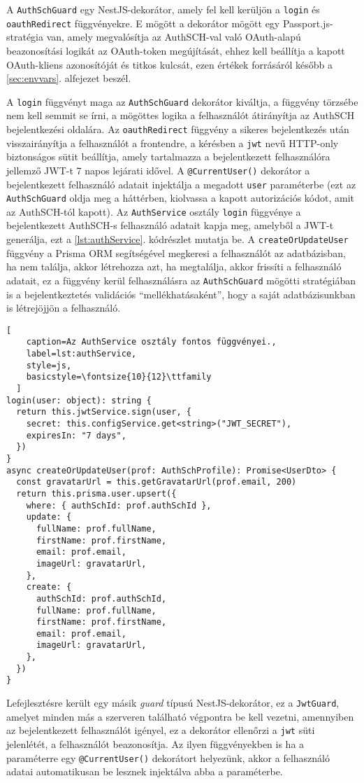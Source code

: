 A \verb|AuthSchGuard| egy NestJS-dekorátor, amely fel kell kerüljön a \verb|login| és \verb|oauthRedirect| függvényekre. E mögött a dekorátor mögött egy Passport.js-stratégia\cite{passport} van, amely megvalósítja az AuthSCH-val való OAuth-alapú beazonosítási logikát az OAuth-token megújítását, ehhez kell beállítja a kapott OAuth-kliens azonosítóját és titkos kulcsát, ezen értékek forrásáról később a \ref{sec:envvars}. alfejezet beszél.

A \verb|login| függvényt maga az \verb|AuthSchGuard| dekorátor kiváltja, a függvény törzsébe nem kell semmit se írni, a mögöttes logika a felhasználót átirányítja az AuthSCH bejelentkezési oldalára. Az \verb|oauthRedirect| függvény a sikeres bejelentkezés után visszairányítja a felhasználót a frontendre, a kérésben a \verb|jwt| nevű HTTP-only biztonságos sütit beállítja, amely tartalmazza a bejelentkezett felhasználóra jellemző JWT-t 7 napos lejárati idővel. A \verb|@CurrentUser()| dekorátor a bejelentkezett felhasználó adatait injektálja a megadott \verb|user| paraméterbe (ezt az \verb|AuthSchGuard| oldja meg a háttérben, kiolvassa a kapott autorizációs kódot, amit az AuthSCH-tól kapott). Az \verb|AuthService| osztály \verb|login| függvénye a bejelentkezett AuthSCH-s felhasználó adatait kapja meg, amelyből a JWT-t generálja, ezt a \ref{lst:authService}. kódrészlet mutatja be. A \verb|createOrUpdateUser| függvény a Prisma ORM segítségével megkeresi a felhasználót az adatbázisban, ha nem találja, akkor létrehozza azt, ha megtalálja, akkor frissíti a felhasználó adatait, ez a függvény kerül felhasználásra az \verb|AuthSchGuard| mögötti stratégiában is a bejelentkeztetés validációs ``mellékhatásaként'', hogy a saját adatbázisunkban is létrejöjjön a felhasználó.

\begin{minipage}{0.92\textwidth}
  \begin{lstlisting}[
    caption=Az AuthService osztály fontos függvényei.,
    label=lst:authService,
    style=js,
    basicstyle=\fontsize{10}{12}\ttfamily
  ]
login(user: object): string {
  return this.jwtService.sign(user, {
    secret: this.configService.get<string>("JWT_SECRET"),
    expiresIn: "7 days",
  })
}
async createOrUpdateUser(prof: AuthSchProfile): Promise<UserDto> {
  const gravatarUrl = this.getGravatarUrl(prof.email, 200)
  return this.prisma.user.upsert({
    where: { authSchId: prof.authSchId },
    update: {
      fullName: prof.fullName,
      firstName: prof.firstName,
      email: prof.email,
      imageUrl: gravatarUrl,
    },
    create: {
      authSchId: prof.authSchId,
      fullName: prof.fullName,
      firstName: prof.firstName,
      email: prof.email,
      imageUrl: gravatarUrl,
    },
  })
}
\end{lstlisting}
\end{minipage}

Lefejlesztésre került egy másik \emph{guard} típusú NestJS-dekorátor, ez a \verb|JwtGuard|, amelyet minden más a szerveren található végpontra be kell vezetni, amennyiben az bejelentkezett felhasználót igényel, ez a dekorátor ellenőrzi a \verb|jwt| süti jelenlétét, a felhasználót beazonosítja. Az ilyen függvényekben is ha a paraméterre egy \verb|@CurrentUser()| dekorátort helyezünk, akkor a felhasználó adatai automatikusan be lesznek injektálva abba a paraméterbe.
